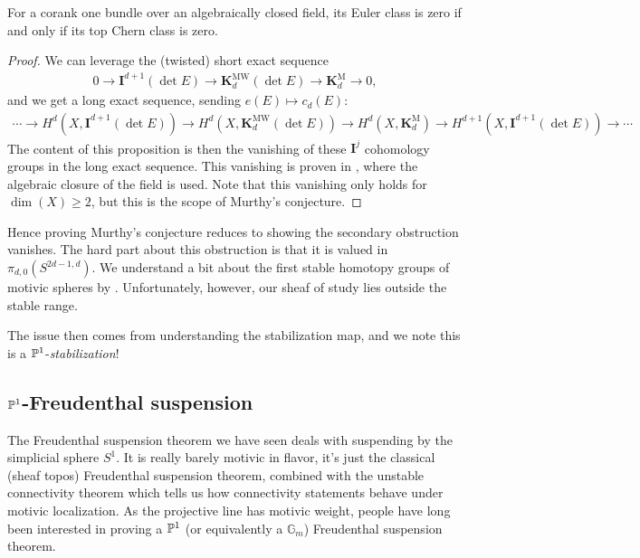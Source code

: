 \documentclass[11pt,openany]{book}
\providecommand{\KM}{\mathbf{K}^\mathrm{M}}
\providecommand{\KMW}{\mathbf{K}^\mathrm{MW}}
\begin{document}
\begin{proposition} \cite[6.3.1]{AF-splitting}
For a corank one bundle over an algebraically closed field, its Euler class is zero if and only if its top Chern class is zero.
\end{proposition}
\begin{proof} We can leverage the (twisted) short exact sequence
\begin{align*}
    0 \to \mathbf{I}^{d+1}(\det E) \to \KMW_d(\det E) \to \KM_d \to 0,
\end{align*}
and we get a long exact sequence, sending $e(E)\mapsto c_{d}(E)$:
\begin{align*}
    \cdots \to H^d(X, \mathbf{I}^{d+1}(\det E)) \to H^d(X, \KMW_d(\det E)) \to H^d(X, \KM_d) \to H^{d+1}(X, \mathbf{I}^{d+1}(\det E)) \to \cdots 
\end{align*}
The content of this proposition is then the vanishing of these $\mathbf{I}^j$ cohomology groups in the long exact sequence. This vanishing is proven in \cite[5.2]{AF3}, where the algebraic closure of the field is used. Note that this vanishing only holds for $\dim(X) \ge 2$, but this is the scope of Murthy's conjecture.
\end{proof}

Hence proving Murthy's conjecture reduces to showing the secondary obstruction vanishes. 
The hard part about this obstruction is that it is valued in $\pi_{d,0}(S^{2d-1,d})$. 
We understand a bit about the first stable homotopy groups of motivic spheres by \cite{RSO}. Unfortunately, however, our sheaf of study lies outside the stable range.

The issue then comes from understanding the stabilization map, and we note this is a $\P^1$-\textit{stabilization}!


\subsection{$\P^1$-Freudenthal suspension}

The Freudenthal suspension theorem we have seen deals with suspending by the simplicial sphere $S^1$. It is really barely motivic in flavor, it's just the classical (sheaf topos) Freudenthal suspension theorem, combined with the unstable connectivity theorem which tells us how connectivity statements behave under motivic localization. As the projective line has motivic weight, people have long been interested in proving a $\P^1$ (or equivalently a $\mathbb{G}_m$) Freudenthal suspension theorem.
\end{document}
